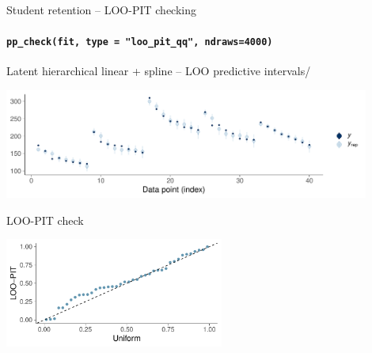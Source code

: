 \documentclass[english,t]{beamer}
\begin{document}
\begin{frame}[fragile]{Student retention -- LOO-PIT checking}
\framesubtitle{\texttt{pp\_check(fit, type = "loo\_pit\_qq", ndraws=4000)}}

\vspace{-0.5\baselineskip}  
Latent hierarchical linear + spline -- LOO predictive intervals/\\  
  \hspace{-7mm}
  \begin{minipage}[t][3.6cm][t]{1.0\linewidth}
    \includegraphics[height=3.6cm]{student_retention_sbinom_ppc_loo_intervals.pdf}
  \end{minipage}  

\vspace{-0.5\baselineskip}  
LOO-PIT check\\  
  \hspace{-7mm}
  \begin{minipage}[t][3.6cm][t]{1.0\linewidth}
    \includegraphics[height=3.6cm]{student_retention_sbinom_ppc_loo_pit_qq.pdf}
  \end{minipage}  

\end{frame}




\end{document}
